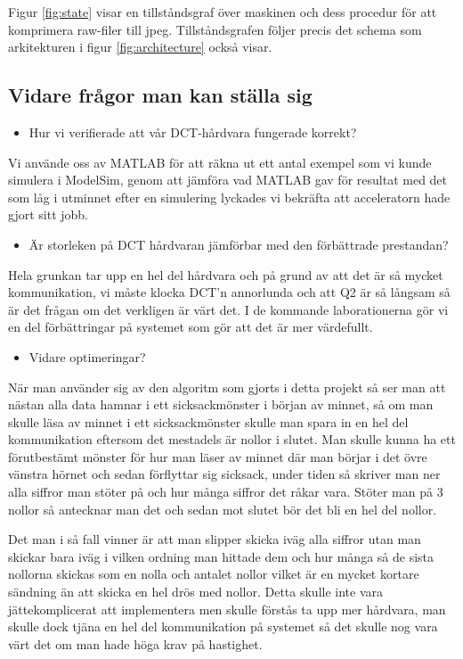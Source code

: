 \documentclass[a4paper]{article}
\begin{document}
Figur \ref{fig:state} visar en tillståndsgraf över maskinen och dess
procedur för att komprimera raw-filer till jpeg. Tillståndsgrafen följer
precis det schema som arkitekturen i figur \ref{fig:architecture} också
visar.

\subsection{Vidare frågor man kan ställa sig}
\begin{itemize}
	\item Hur vi verifierade att vår DCT-hårdvara fungerade korrekt?
\end{itemize}

Vi använde oss av MATLAB för att räkna ut ett antal exempel som vi kunde
simulera i ModelSim, genom att jämföra vad MATLAB gav för resultat med
det som låg i utminnet efter en simulering lyckades vi bekräfta att
acceleratorn hade gjort sitt jobb.

\begin{itemize}
	\item Är storleken på DCT hårdvaran jämförbar med den förbättrade prestandan?
\end{itemize}

Hela grunkan tar upp en hel del hårdvara och på grund av att det är så
mycket kommunikation, vi måste klocka DCT\rq{}n annorlunda och att Q2 är
så långsam så är det frågan om det verkligen är värt det. I de kommande
laborationerna gör vi en del förbättringar på systemet som gör att det
är mer värdefullt.

\begin{itemize}
	\item Vidare optimeringar?
\end{itemize}

När man använder sig av den algoritm som gjorts i detta projekt så ser
man att nästan alla data hamnar i ett sicksackmönster i början av
minnet, så om man skulle läsa av minnet i ett sicksackmönster skulle man
spara in en hel del kommunikation eftersom det mestadels är nollor i
slutet. Man skulle kunna ha ett förutbestämt mönster för hur man läser
av minnet där man börjar i det övre vänstra hörnet och sedan förflyttar
sig sicksack, under tiden så skriver man ner alla siffror man stöter på
och hur många siffror det råkar vara. Stöter man på 3 nollor så
antecknar man det och sedan mot slutet bör det bli en hel del nollor.

Det man i så fall vinner är att man slipper skicka iväg alla siffror
utan man skickar bara iväg i vilken ordning man hittade dem och hur
många så de sista nollorna skickas som en nolla och antalet nollor
vilket är en mycket kortare sändning än att skicka en hel drös med
nollor. Detta skulle inte vara jättekomplicerat att implementera men
skulle förstås ta upp mer hårdvara, man skulle dock tjäna en hel del
kommunikation på systemet så det skulle nog vara värt det om man hade
höga krav på hastighet.
\end{document}

